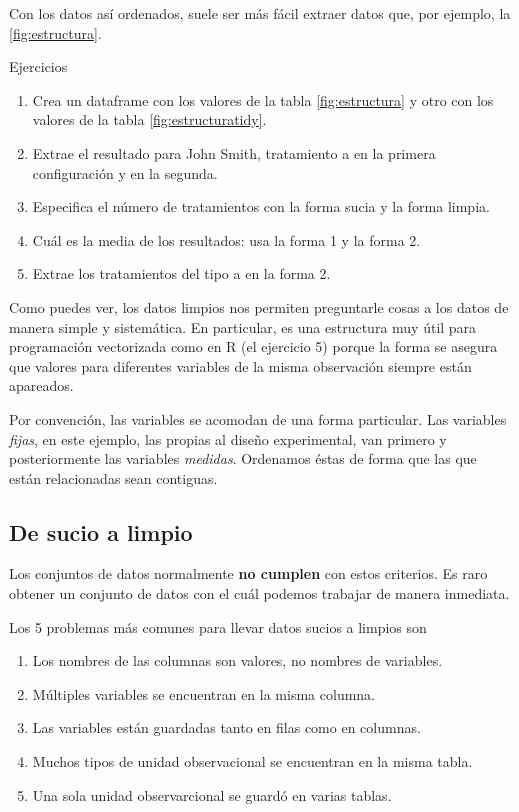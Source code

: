 \documentclass[]{article}
\begin{document}
Con los datos así ordenados, suele ser más fácil extraer datos que, por
ejemplo, la \ref{fig:estructura}.

\renewcommand\bcStyleTitre[1]{\large\textcolor{bbblack}{#1}}

\begin{bclogo}[
  couleur=llred,
  arrondi=0,
  logo=\bcstop,
  barre=none,
  noborder=true]{Ejercicios}
\begin{enumerate}
\item Crea un dataframe con los valores de la tabla \ref{fig:estructura} y otro 
con los valores de la tabla \ref{fig:estructuratidy}.
\item Extrae el resultado para John Smith, tratamiento a en la primera configuración y en la segunda.
\item Especifica el número de tratamientos con la forma sucia y la forma limpia.
\item Cuál es la media de los resultados: usa la forma 1 y la forma 2.
\item Extrae los tratamientos del tipo a en la forma 2.
\end{enumerate}

\end{bclogo}

Como puedes ver, los datos limpios nos permiten preguntarle cosas a los
datos de manera simple y sistemática. En particular, es una estructura
muy útil para programación vectorizada como en R (el ejercicio 5) porque
la forma se asegura que valores para diferentes variables de la misma
observación siempre están apareados.

Por convención, las variables se acomodan de una forma particular. Las
variables \emph{fijas}, en este ejemplo, las propias al diseño
experimental, van primero y posteriormente las variables \emph{medidas}.
Ordenamos éstas de forma que las que están relacionadas sean contiguas.

\subsection{De sucio a limpio}\label{de-sucio-a-limpio}

Los conjuntos de datos normalmente \textbf{no cumplen} con estos
criterios. Es raro obtener un conjunto de datos con el cuál podemos
trabajar de manera inmediata.

Los 5 problemas más comunes para llevar datos sucios a limpios son

\begin{enumerate}
\def\labelenumi{\arabic{enumi}.}
\itemsep1pt\parskip0pt
\item
  Los nombres de las columnas son valores, no nombres de variables.
\item
  Múltiples variables se encuentran en la misma columna.
\item
  Las variables están guardadas tanto en filas como en columnas.
\item
  Muchos tipos de unidad observacional se encuentran en la misma tabla.
\item
  Una sola unidad observarcional se guardó en varias tablas.
\end{enumerate}
\end{document}
